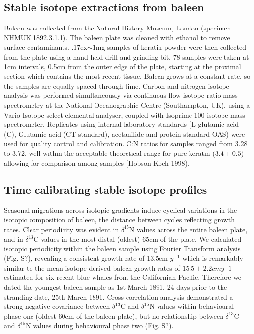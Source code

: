 \documentclass[a4paper,12pt]{article}
\begin{document}
\subsection{Stable isotope extractions from baleen}
Baleen was collected from the Natural History Museum, London (specimen NHMUK.1892.3.1.1). 
The baleen plate was cleaned with ethanol to remove surface contaminants. 
{\raise.17ex\hbox{$\scriptstyle\sim$}}1mg samples of keratin powder were then collected from the plate using a hand-held drill and grinding bit. 
78 samples were taken at 1cm intervals, 0.5cm from the outer edge of the plate, starting at the proximal section which contains the most recent tissue. 
Baleen grows at a constant rate, so the samples are equally spaced through time\cite{best1996stable}. Carbon and nitrogen isotope analysis was performed simultaneously via continuous-flow isotope ratio mass spectrometry at the National Oceanographic Centre (Southampton, UK), using a Vario Isotope select elemental analyser, coupled with Isoprime 100 isotope mass spectrometer. 
Replicates using internal laboratory standards (L-glutamic acid (C), Glutamic acid (CT standard), acetanilide and protein standard OAS) were used for quality control and calibration. 
C:N ratios for samples ranged from 3.28\text{\textperthousand} to 3.72\text{\textperthousand}, well within the acceptable theoretical range for pure keratin ($3.4\pm0.5$) allowing for comparison among samples (Hobson  Koch 1998). 
 
\subsection{Time calibrating stable isotope profiles}
Seasonal migrations across isotopic gradients induce cyclical variations in the isotopic composition of baleen, the distance between cycles reflecting growth rates\cite{hobson1998stable,busquets2017estimating}. 
Clear periodicity was evident in $\delta^{15}$N values across the entire baleen plate, and in $\delta^{13}$C values in the most distal (oldest) 65cm of the plate. 
We calculated isotopic periodicity within the baleen sample using Fourier Transform analysis\cite{cardona2017temporal} (Fig. S?), revealing a consistent growth rate of 13.5cm $y^{-1}$ which is remarkably similar to the mean isotope-derived baleen growth rates of $15.5 \pm 2.2cm y{^-1}$ estimated for six recent blue whales from the Californian Pacific\cite{busquets2017estimating}.  
Therefore we dated the youngest baleen sample as 1st March 1891, 24 days prior to the stranding date, 25th March 1891. 
Cross-correlation analysis demonstrated a strong negative covariance between $\delta^{13}$C and $\delta^{15}$N values within behavioural phase one (oldest 60cm of the baleen plate), but no relationship between $\delta^{13}$C and $\delta^{15}$N values during behavioural phase two (Fig. S?).
 
\end{document}
